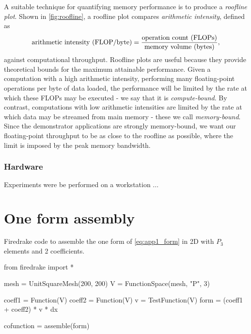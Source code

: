 \documentclass[thesis]{subfiles}
\begin{document}
A suitable technique for quantifying memory performance is to produce a \emph{roofline plot}.
Shown in \cref{fig:roofline}, a roofline plot compares \emph{arithmetic intensity}, defined as
\begin{equation*}
  \textnormal{arithmetic intensity (FLOP/byte)} = \frac{\textnormal{operation count (FLOPs)}}{\textnormal{memory volume (bytes)}},
\end{equation*}
against computational throughput.
Roofline plots are useful because they provide theoretical bounds for the maximum attainable performance.
Given a computation with a high arithmetic intensity, performing many floating-point operations per byte of data loaded, the performance will be limited by the rate at which these FLOPs may be executed - we say that it is \emph{compute-bound}.
By contrast, computations with low arithmetic intensities are limited by the rate at which data may be streamed from main memory - these we call \emph{memory-bound}.
Since the demonstrator applications are strongly memory-bound, we want our floating-point throughput to be as close to the roofline as possible, where the limit is imposed by the peak memory bandwidth.

\subsubsection{Hardware}

Experiments were be performed on a workstation ...


\section{One form assembly}



\begin{listing}
  \centering
  \caption{
    Firedrake code to assemble the one form of \cref{eq:app1_form} in 2D with $P_3$ elements and 2 coefficients.
  }
  \begin{minipage}{.9\textwidth}
    \begin{pyalg2}
      from firedrake import *

      mesh = UnitSquareMesh(200, 200)
      V = FunctionSpace(mesh, "P", 3)

      coeff1 = Function(V)
      coeff2 = Function(V)
      v = TestFunction(V)
      form = (coeff1 + coeff2) * v * dx

      cofunction = assemble(form)
    \end{pyalg2}
  \end{minipage}
  \label{listing:app1_code}
\end{listing}
\end{document}
